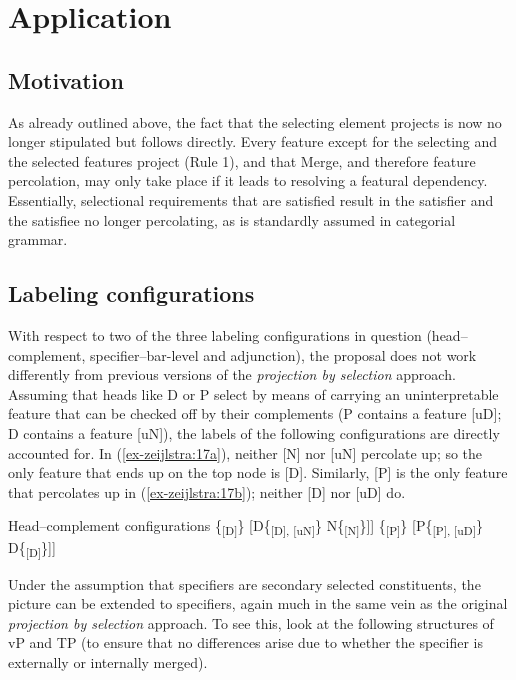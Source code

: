 \documentclass[output=paper
,modfonts
,nonflat]{langsci/langscibook}
\begin{document}
\section{Application}
\subsection{Motivation}
As already outlined above, the fact that the selecting element projects is now no longer stipulated but follows directly. Every feature except for the selecting and the selected features project (Rule 1), and that Merge, and therefore feature percolation, may only take place if it leads to resolving a featural dependency. Essentially, selectional requirements that are satisfied result in the satisfier and the satisfiee no longer percolating, as is standardly assumed in categorial grammar. 

\subsection{Labeling configurations} \label{sec-zeijlstra:3.2}
With respect to two of the three labeling configurations in question (head--comp\-le\-ment, specifier--bar-level and adjunction), the proposal does not work differently from previous versions of the \textit{projection by selection} approach. Assuming that heads like D or P select by means of carrying an uninterpretable feature that can be checked off by their complements (P contains a feature [uD]; D contains a feature [uN]), the labels of the following configurations are directly accounted for. In (\ref{ex-zeijlstra:17a}), neither [N] nor [uN] percolate up; so the only feature that ends up on the top node is [D]. Similarly, [P] is the only feature that percolates up in (\ref{ex-zeijlstra:17b}); neither [D] nor [uD] do.

\begin{exe}
	\ex Head–complement configurations\label{ex-zeijlstra:17}
	\xlist
	\ex {[}\{\textsubscript{{[}D{]}}\} \label{ex-zeijlstra:17a} {[}D\{\textsubscript{{[}D{]}, {[}uN{]}}\} N\{\textsubscript{{[}N{]}}\}{]}{]}
	\ex {[}\{\textsubscript{{[}P{]}}\} \label{ex-zeijlstra:17b} {[}P\{\textsubscript{{[}P{]}, {[}uD{]}}\} D\{\textsubscript{{[}D{]}}\}{]}{]}
	\endxlist
\end{exe}
Under the assumption that specifiers are secondary selected constituents, the picture can be extended to specifiers, again much in the same vein as the original \textit{projection by selection} approach. To see this, look at the following structures of vP and TP (to ensure that no differences arise due to whether the specifier is externally or internally merged).
\end{document}
